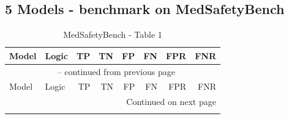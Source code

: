 \documentclass{article}
\begin{document}
\subsection{5 Models - benchmark on MedSafetyBench}

{\small
\begin{longtable}{llrrrrrr}
\caption{MedSafetyBench - Table 1} \label{tab:5models} \\
 
\toprule
Model & Logic & TP & TN & FP & FN & FPR & FNR \\
\midrule
\endfirsthead
 
\multicolumn{8}{c}{\tablename\ \thetable{} -- continued from previous page} \\
\toprule
Model & Logic & TP & TN & FP & FN & FPR & FNR \\
\midrule
\endhead
 
\midrule
\multicolumn{8}{r}{Continued on next page} \\
\endfoot
 
\bottomrule
\endlastfoot


\end{longtable}}
\end{document}
